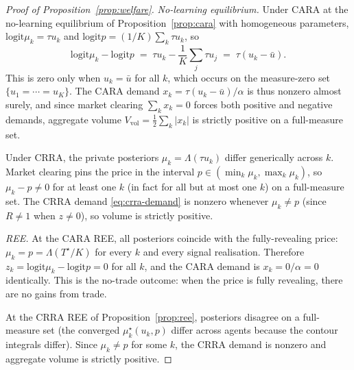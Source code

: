 \documentclass[12pt,letterpaper]{article}
\theoremstyle{definition}
\theoremstyle{remark}
\newcommand{\Lam}{\Lambda}            %
\newcommand{\logit}{\mathrm{logit}}
\newcommand{\Tstar}{T^{\!\star}}
\newcommand{\1}{\mathbf{1}}
\begin{document}
\begin{proof}[Proof of Proposition~\ref{prop:welfare}]
\emph{No-learning equilibrium.} Under CARA at the no-learning
equilibrium of Proposition~\ref{prop:cara} with homogeneous parameters,
$\logit\mu_{k}=\tau u_{k}$ and $\logit p=(1/K)\sum_{k}\tau u_{k}$, so
\[
   \logit\mu_{k}-\logit p
   \;=\; \tau u_{k} - \frac{1}{K}\sum_{j}\tau u_{j}
   \;=\; \tau(u_{k}-\bar u).
\]
This is zero only when $u_{k}=\bar u$ for all $k$, which occurs on the
measure-zero set $\{u_{1}=\cdots=u_{K}\}$. The CARA demand
$x_{k}=\tau(u_{k}-\bar u)/\alpha$ is thus nonzero almost surely, and
since market clearing $\sum_{k}x_{k}=0$ forces both positive and
negative demands, aggregate volume
$V_{\mathrm{vol}}=\tfrac12\sum_{k}|x_{k}|$ is strictly positive on a
full-measure set.

Under CRRA, the private posteriors $\mu_{k}=\Lam(\tau u_{k})$ differ
generically across $k$. Market clearing pins the price in the interval
$p\in(\min_{k}\mu_{k},\max_{k}\mu_{k})$, so $\mu_{k}-p\neq 0$ for at
least one $k$ (in fact for all but at most one $k$) on a full-measure set.
The CRRA demand \eqref{eq:crra-demand} is nonzero whenever $\mu_{k}\neq p$
(since $R\neq 1$ when $z\neq 0$), so volume is strictly positive.

\emph{REE.} At the CARA REE, all posteriors coincide with the
fully-revealing price: $\mu_{k}=p=\Lam(\Tstar/K)$ for every $k$ and
every signal realisation. Therefore
$z_{k}=\logit\mu_{k}-\logit p=0$ for all $k$, and the CARA demand
is $x_{k}=0/\alpha=0$ identically. This is the \citet{Milgrom1982}
no-trade outcome: when the price is fully revealing, there are no gains
from trade.

At the CRRA REE of Proposition~\ref{prop:ree}, posteriors disagree on
a full-measure set (the converged $\mu_{k}^{\star}(u_{k},p)$ differ
across agents because the contour integrals differ). Since
$\mu_{k}\neq p$ for some $k$, the CRRA demand is nonzero and aggregate
volume is strictly positive.
\end{proof}
\end{document}
